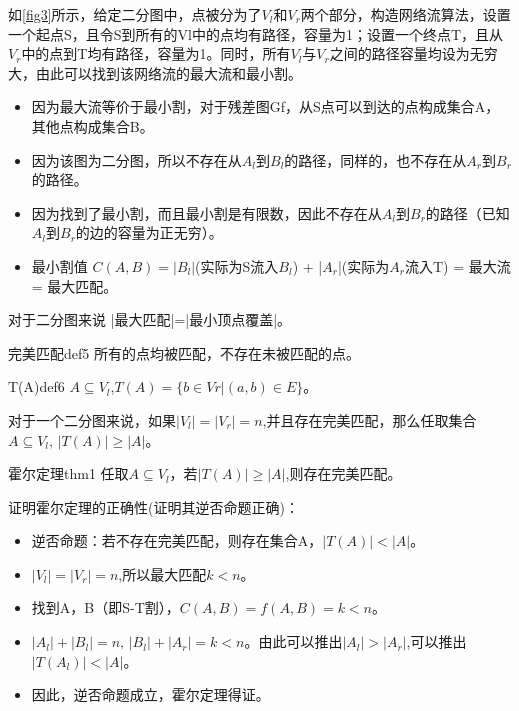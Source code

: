 \begin{example}
  如\autoref{fig3}所示，给定二分图中，点被分为了\(V_l\)和\(V_r\)两个部分，构造网络流算法，设置一个起点S，且令S到所有的Vl中的点均有路径，容量为1；设置一个终点T，且从\(V_r\)中的点到T均有路径，容量为1。同时，所有\(V_l\)与\(V_r\)之间的路径容量均设为无穷大，由此可以找到该网络流的最大流和最小割。
\end{example}

\begin{itemize}
  \item 因为最大流等价于最小割，对于残差图Gf，从S点可以到达的点构成集合A，其他点构成集合B。
  \item 因为该图为二分图，所以不存在从\(A_l\)到\(B_l\)的路径，同样的，也不存在从\(A_r\)到\(B_r\)的路径。
  \item 因为找到了最小割，而且最小割是有限数，因此不存在从\(A_l\)到\(B_r\)的路径（已知\(A_l\)到\(B_r\)的边的容量为正无穷）。
  \item 最小割值 \(C(A,B) = |B_l|\)(实际为S流入\(B_l\)) + |\(A_r\)|(实际为\(A_r\)流入T) = 最大流 = 最大匹配。
\end{itemize}
对于二分图来说 |最大匹配|=|最小顶点覆盖|。

\begin{definition}{完美匹配}{def5}
    所有的点均被匹配，不存在未被匹配的点。
\end{definition}

\begin{definition}{T(A)}{def6}
  \(A \subseteq V_l\),\(T(A) = \{b \in Vr | (a,b) \in E \}\)。
\end{definition}

对于一个二分图来说，如果\(|V_l|=|V_r|=n\),并且存在完美匹配，那么任取集合\(A \subseteq V_l,\,|T(A)| \ge |A|\)。

\begin{theorem}{霍尔定理}{thm1}
  任取\(A \subseteq V_l\)，若\(|T(A)| \ge |A|\),则存在完美匹配。
\end{theorem}
证明霍尔定理的正确性(证明其逆否命题正确)：
\begin{itemize}
  \item 逆否命题：若不存在完美匹配，则存在集合A，\(|T(A)| < |A|\)。
  \item \(|V_l|=|V_r|=n\),所以最大匹配\(k<n\)。
  \item 找到A，B（即S-T割），\(C(A,B) = f(A,B) = k<n\)。
  \item \(|A_l|+|B_l| = n,\,|B_l|+|A_r| = k < n\)。由此可以推出\(|A_l| > |A_r|\),可以推出\(|T(A_l)| < |A|\)。
  \item 因此，逆否命题成立，霍尔定理得证。
\end{itemize}

